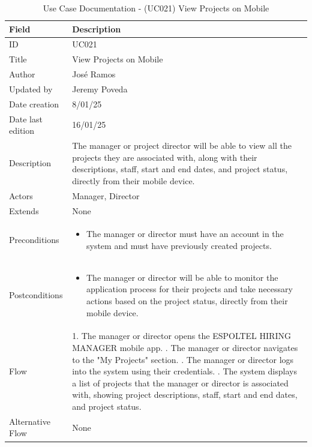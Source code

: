 \documentclass{scrreprt}
\begin{document}
\begin{table}[H]
	\centering
	\begin{tabular}{|p{3cm}|p{10cm}|}
		\hline
		\textbf{Field} & \textbf{Description} \\ \hline
		ID & UC021 \\ \hline
		Title & View Projects on Mobile \\ \hline
		Author & José Ramos \\ \hline
		Updated by & Jeremy Poveda\\ \hline
		Date creation & 8/01/25 \\ \hline
		Date last edition & 16/01/25 \\ \hline
		Description & 
		The manager or project director will be able to view all the projects they are associated with, along with their descriptions, staff, start and end dates, and project status, directly from their mobile device. \\ \hline
		Actors & Manager, Director \\ \hline
		Extends & None \\ \hline
		Preconditions & 
		\begin{itemize}
			\item The manager or director must have an account in the system and must have previously created projects.
		\end{itemize} \\ \hline
		Postconditions & 
		\begin{itemize}
			\item The manager or director will be able to monitor the application process for their projects and take necessary actions based on the project status, directly from their mobile device.
		\end{itemize} \\ \hline
		Flow & 
		1. The manager or director opens the ESPOLTEL HIRING MANAGER mobile app. \newline
		2. The manager or director navigates to the "My Projects" section. \newline
		3. The manager or director logs into the system using their credentials. \newline
		4. The system displays a list of projects that the manager or director is associated with, showing project descriptions, staff, start and end dates, and project status. \\ \hline
		Alternative Flow & 
		None \\ \hline
	\end{tabular}
	\caption{Use Case Documentation - (UC021) View Projects on Mobile}
	\label{table:UC021}
\end{table}
\end{document}
